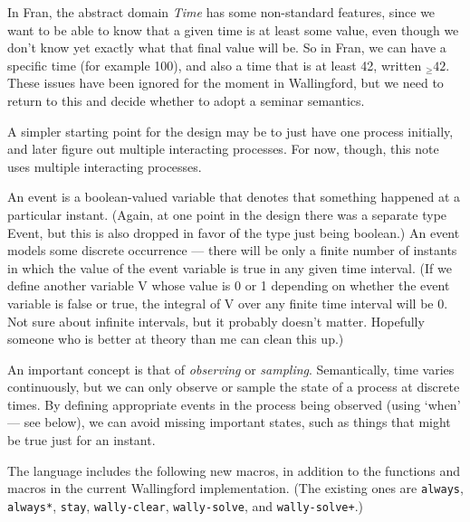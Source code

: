 \documentclass{article}
\begin{document}
In Fran, the abstract domain \emph{Time} has some non-standard features,
since we want to be able to know that a given time is at least some
value, even though we don't know yet exactly what that final value will be.
So in Fran, we can have a specific time (for example 100), and also a time
that is at least 42, written $_{\geq} 42$.  These issues have been ignored
for the moment in Wallingford, but we need to return to this and decide
whether to adopt a seminar semantics.

A simpler starting point for the design may be to just have one process
initially, and later figure out multiple interacting processes.  For now,
though, this note uses multiple interacting processes.

An event is a boolean-valued variable that denotes that something
happened at a particular instant.  (Again, at one point in the design
there was a separate type Event, but this is also dropped in favor of
the type just being boolean.)  An event models some discrete
occurrence --- there will be only a finite number of instants in which
the value of the event variable is true in any given time interval.
(If we define another variable V whose value is 0 or 1 depending on
whether the event variable is false or true, the integral of V over
any finite time interval will be 0.  Not sure about infinite
intervals, but it probably doesn't matter.  Hopefully someone who is
better at theory than me can clean this up.)

An important concept is that of \emph{observing} or \emph{sampling}.
Semantically, time varies continuously, but we can only observe or
sample the state of a process at discrete times.  By defining appropriate
events in the process being observed (using `when' --- see below), we can
avoid missing important states, such as things that might be true just for
an instant.

The language includes the following new macros, in addition to the
functions and macros in the current Wallingford implementation.  (The
existing ones are \verb|always|, \verb|always*|, \verb|stay|,
\verb|wally-clear|, \verb|wally-solve|, and \verb|wally-solve+|.)
\end{document}
